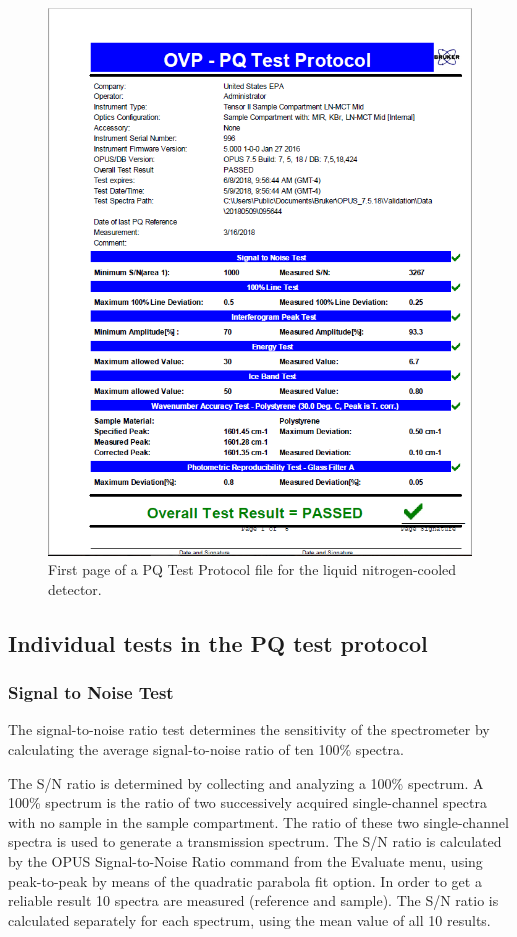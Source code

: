 \begin{figure}[htp]
    \centering
    \includegraphics[width=6.5in]{PQtestMCT.PNG}
    \caption{First page of a PQ Test Protocol file for the liquid nitrogen-cooled detector.}
    \label{fig:samplePQ2}
\end{figure}

\subsection{Individual tests in the PQ test protocol}
\label{subsec:individualPQ}
\subsubsection{Signal to Noise Test}
The signal-to-noise ratio test determines the sensitivity of the spectrometer by calculating the average signal-to-noise ratio of ten 100\% spectra.

The S/N ratio is determined by collecting and analyzing a 100\% spectrum. A 100\% spectrum is the ratio of two successively acquired single-channel spectra with no sample in the sample compartment. The ratio of these two single-channel spectra is used to generate a transmission spectrum. The S/N ratio is calculated by the OPUS Signal-to-Noise Ratio command from the Evaluate menu, using peak-to-peak by means of the quadratic parabola fit option. In order to get a reliable result 10 spectra are measured (reference and sample). The S/N ratio is calculated separately for each spectrum, using the mean value of all 10 results. 

